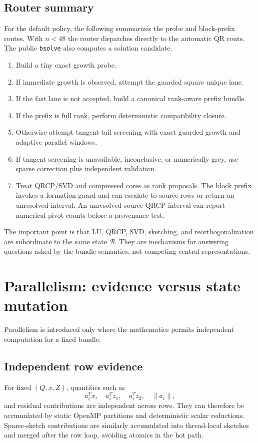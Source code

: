 \documentclass[11pt]{article}
\theoremstyle{definition}
\newcommand{\Bun}{\mathcal{B}}
\begin{document}
\subsection{Router summary}
For the default policy, the following summarizes the probe and block-prefix routes. With $n<48$ the router dispatches directly to the automatic QR route. The public \texttt{bsolve} also computes a solution candidate.
\begin{enumerate}
\item Build a tiny exact growth probe.
\item If immediate growth is observed, attempt the guarded square unique lane.
\item If the fast lane is not accepted, build a canonical rank-aware prefix bundle.
\item If the prefix is full rank, perform deterministic compatibility closure.
\item Otherwise attempt tangent-tail screening with exact guarded growth and adaptive parallel windows.
\item If tangent screening is unavailable, inconclusive, or numerically grey, use sparse correction plus independent validation.
\item Treat QRCP/SVD and compressed cores as rank proposals. The block prefix invokes a formation guard and can escalate to source rows or return an unresolved interval. An unresolved source QRCP interval can report numerical pivot counts before a provenance test.
\end{enumerate}

The important point is that LU, QRCP, SVD, sketching, and reorthogonalization are subordinate to the same state \(\Bun\). They are mechanisms for answering questions asked by the bundle semantics, not competing central representations.

\section{Parallelism: evidence versus state mutation}\label{sec:parallel}
Parallelism is introduced only where the mathematics permits independent computation for a fixed bundle.

\subsection{Independent row evidence}
For fixed \((Q,x,Z)\), quantities such as
\[
a_i^Tx,\quad a_i^Tz_1,\quad a_i^Tz_2,\quad \|a_i\|,
\]
and residual contributions are independent across rows. They can therefore be accumulated by static OpenMP partitions and deterministic scalar reductions. Sparse-sketch contributions are similarly accumulated into thread-local sketches and merged after the row loop, avoiding atomics in the hot path.
\end{document}
